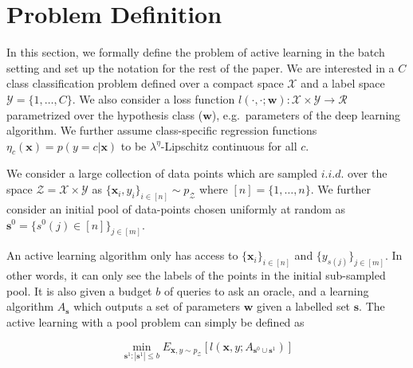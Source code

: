 \documentclass{article} %
\begin{document}
\section{Problem Definition} In this section, we formally define the problem of active learning in the batch setting and set
up the notation for the rest of the paper. We are interested in a $C$ class classification problem defined over a
compact space $\mathcal{X}$ and a label space  $\mathcal{Y}=\{1,\ldots,C\}$. We also consider a loss function
$l(\cdot,\cdot;\mathbf{w}):\mathcal{X}\times \mathcal{Y} \rightarrow \mathcal{R}$ parametrized over the hypothesis class
($\mathbf{w}$), e.g.\ parameters of the deep learning algorithm. We further assume class-specific regression functions
$\eta_c(\mathbf{x})=p(y=c|\mathbf{x})$ to be \mbox{$\lambda^\eta$-Lipschitz} continuous for all $c$.

We consider a large collection of data points which are sampled $i.i.d.$ over the space
$\mathcal{Z}=\mathcal{X}\times\mathcal{Y}$ as \mbox{$\{\mathbf{x}_i,y_i\}_{i \in [n]} \sim p_\mathcal{Z}$} where
$[n]=\{1,\ldots,n\}$. We further consider an initial pool of data-points chosen uniformly at random as
\mbox{$\mathbf{s}^0=\{s^0(j) \in [n]\}_{j \in [m]}$}.

An active learning algorithm only has access to $\{\mathbf{x}_i\}_{i \in [n]}$ and $\{y_{s(j)}\}_{j \in [m] }$. In other
words, it can only see the labels of the points in the initial sub-sampled pool. It is also given a budget $b$ of
queries to ask an oracle, and a learning algorithm $A_{\mathbf{s}}$ which outputs a set of parameters $\mathbf{w}$ given
a labelled set $\mathbf{s}$. The active learning with a pool problem can simply be defined as 

\begin{equation} 
    \min_{\mathbf{s}^1 : |\mathbf{s}^1| \leq b} E_{\mathbf{x},y \sim p_\mathcal{Z}} [l(\mathbf{x},y;
A_{\mathbf{s}^0 \cup \mathbf{s}^1})] 
    \label{eq:expectation}
\end{equation} 
\end{document}
